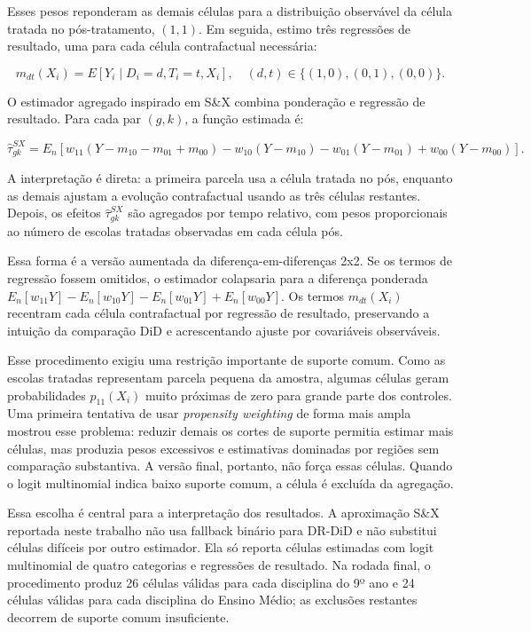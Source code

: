 Esses pesos reponderam as demais células para a distribuição observável da célula tratada no pós-tratamento, $(1,1)$. Em seguida, estimo três regressões de resultado, uma para cada célula contrafactual necessária:

\begin{equation}
m_{dt}(X_i)=E[Y_i \mid D_i=d,T_i=t,X_i], \quad (d,t)\in\{(1,0),(0,1),(0,0)\}.
\end{equation}

O estimador agregado inspirado em S\&X combina ponderação e regressão de resultado. Para cada par $(g,k)$, a função estimada é:

\begin{equation}
\widehat{\tau}_{gk}^{SX} =
E_n\left[
w_{11}(Y-m_{10}-m_{01}+m_{00})
-w_{10}(Y-m_{10})
-w_{01}(Y-m_{01})
+w_{00}(Y-m_{00})
\right].
\end{equation}

A interpretação é direta: a primeira parcela usa a célula tratada no pós, enquanto as demais ajustam a evolução contrafactual usando as três células restantes. Depois, os efeitos $\widehat{\tau}_{gk}^{SX}$ são agregados por tempo relativo, com pesos proporcionais ao número de escolas tratadas observadas em cada célula pós.

Essa forma é a versão aumentada da diferença-em-diferenças 2x2. Se os termos de regressão fossem omitidos, o estimador colapsaria para a diferença ponderada $E_n[w_{11}Y]-E_n[w_{10}Y]-E_n[w_{01}Y]+E_n[w_{00}Y]$. Os termos $m_{dt}(X_i)$ recentram cada célula contrafactual por regressão de resultado, preservando a intuição da comparação DiD e acrescentando ajuste por covariáveis observáveis.

Esse procedimento exigiu uma restrição importante de suporte comum. Como as escolas tratadas representam parcela pequena da amostra, algumas células geram probabilidades $p_{11}(X_i)$ muito próximas de zero para grande parte dos controles. Uma primeira tentativa de usar \textit{propensity weighting} de forma mais ampla mostrou esse problema: reduzir demais os cortes de suporte permitia estimar mais células, mas produzia pesos excessivos e estimativas dominadas por regiões sem comparação substantiva. A versão final, portanto, não força essas células. Quando o logit multinomial indica baixo suporte comum, a célula é excluída da agregação.

Essa escolha é central para a interpretação dos resultados. A aproximação S\&X reportada neste trabalho não usa fallback binário para DR-DiD e não substitui células difíceis por outro estimador. Ela só reporta células estimadas com logit multinomial de quatro categorias e regressões de resultado. Na rodada final, o procedimento produz 26 células válidas para cada disciplina do 9º ano e 24 células válidas para cada disciplina do Ensino Médio; as exclusões restantes decorrem de suporte comum insuficiente.

